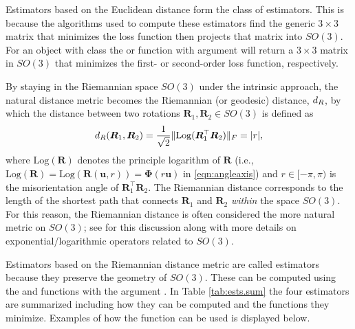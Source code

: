 Estimators based on the Euclidean distance form the class of  estimators.  This is because the algorithms used to compute these estimators find the generic $3\times 3$ matrix that minimizes the loss function then projects that matrix into $SO(3)$.  For an object with class  the  or  function with argument  will return a $3\times 3$ matrix in $SO(3)$ that minimizes the first- or second-order loss function, respectively.

By staying in the Riemannian space $SO(3)$ under the intrinsic approach, the natural distance metric becomes the Riemannian (or geodesic) distance, $d_R$, by which the distance between two rotations $\bm{R}_1,\bm{R}_2\in SO(3)$  is  defined as 
\begin{equation}
\label{d_R}
d_R(\bm{R}_1,\bm{R}_2)=  \frac{1}{\sqrt{2}}\|\text{Log}(\bm{R}_1^\top\bm{R}_2)\|_F = |r|,
\end{equation}
where $\text{Log}(\bm{R})$ denotes the principle logarithm of $\bm{R}$ (i.e., $\text{Log}(\bm{R}) = \text{Log}(\bm{R}(\bm u,r))= \bm \Phi(r\bm u)$ in \eqref{eqn:angleaxis}) and $r\in[-\pi,\pi)$ is the misorientation angle of $\bm{R}_1^\top \bm{R}_2$.  The Riemannian distance corresponds to the length of the shortest path that connects $\bm{R}_1$ and $\bm{R}_2$ {\it within} the space $SO(3)$. For this reason, the Riemannian distance is often considered the more natural metric on $SO(3)$; see \citet{moakher2002} for this discussion along with more details on exponential/logarithmic operators related to $SO(3)$.

Estimators based on the Riemannian distance metric are called  estimators because they preserve the geometry of $SO(3)$.  These can be computed using the  and  functions with the argument .  In Table \ref{tab:ests.sum} the four estimators are summarized including how they can be computed and the functions they minimize.  Examples of how the function can be used is displayed below.

